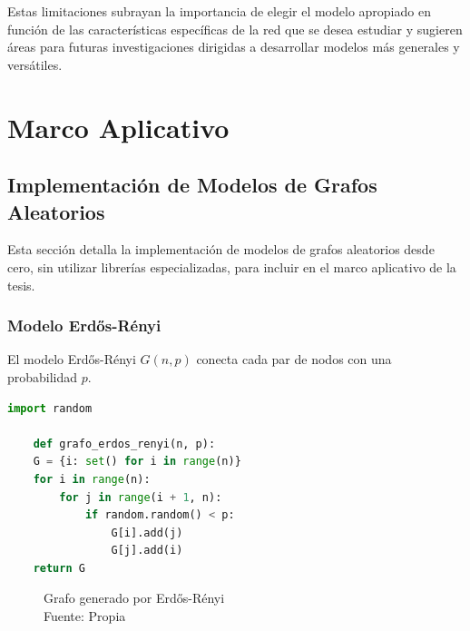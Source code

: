 \documentclass[12pt]{book}
\begin{document}
Estas limitaciones subrayan la importancia de elegir el modelo apropiado en función de las características específicas de la red que se desea estudiar y sugieren áreas para futuras investigaciones dirigidas a desarrollar modelos más generales y versátiles.

\chapter{Marco Aplicativo}

\section{Implementación de Modelos de Grafos Aleatorios}
Esta sección detalla la implementación de modelos de grafos aleatorios desde cero, sin utilizar librerías especializadas, para incluir en el marco aplicativo de la tesis.


\subsection{Modelo Erdős-Rényi}
El modelo Erdős-Rényi \( G(n, p) \) conecta cada par de nodos con una probabilidad \( p \).

\begin{lstlisting}[language=Python]
    import random
    
    def grafo_erdos_renyi(n, p):
    G = {i: set() for i in range(n)}
    for i in range(n):
        for j in range(i + 1, n):
            if random.random() < p:
                G[i].add(j)
                G[j].add(i)
    return G
\end{lstlisting}
\newpage

\begin{figure}
\caption{Grafo generado por Erdős-Rényi\\Fuente: Propia}
\end{figure}
\end{document}
